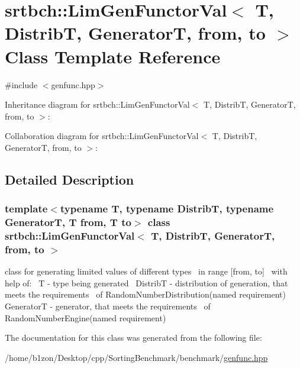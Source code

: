 \hypertarget{classsrtbch_1_1LimGenFunctorVal}{}\section{srtbch\+:\+:Lim\+Gen\+Functor\+Val$<$ T, DistribT, GeneratorT, from, to $>$ Class Template Reference}
\label{classsrtbch_1_1LimGenFunctorVal}


{\ttfamily \#include $<$genfunc.\+hpp$>$}



Inheritance diagram for srtbch\+:\+:Lim\+Gen\+Functor\+Val$<$ T, DistribT, GeneratorT, from, to $>$\+:


Collaboration diagram for srtbch\+:\+:Lim\+Gen\+Functor\+Val$<$ T, DistribT, GeneratorT, from, to $>$\+:


\subsection{Detailed Description}
\subsubsection*{template$<$typename T, typename DistribT, typename GeneratorT, T from, T to$>$\newline
class srtbch\+::\+Lim\+Gen\+Functor\+Val$<$ T, Distrib\+T, Generator\+T, from, to $>$}

class for generating limited values of different types~\newline
in range \mbox{[}from, to\mbox{]}~\newline
with help of\+:~\newline
T -\/ type being generated~\newline
DistribT -\/ distribution of generation, that meets the requirements~\newline
of Random\+Number\+Distribution(named requirement)~\newline
GeneratorT -\/ generator, that meets the requirements~\newline
of Random\+Number\+Engine(named requirement)~\newline


The documentation for this class was generated from the following file\+:\begin{DoxyCompactItemize}
\item 
/home/b1zon/\+Desktop/cpp/\+Sorting\+Benchmark/benchmark/\hyperlink{genfunc_8hpp}{genfunc.\+hpp}\end{DoxyCompactItemize}
